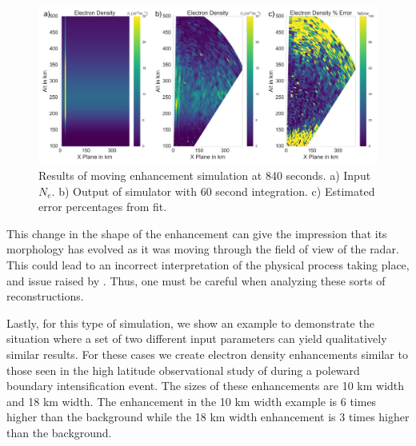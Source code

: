 \documentclass[draft,ras]{agutex}
\begin{document}
\begin{article}
\begin{figure}[!t]
\centering
\includegraphics[width=6in]{moving14mins}
\caption{Results of moving enhancement simulation at 840 seconds. a) Input $N_e$. b) Output of simulator with 60 second integration. c) Estimated error percentages from fit.}
\label{fig:moving14mins}
\end{figure}

This change in the shape of the enhancement can give the impression that its morphology has evolved as it was moving through the field of view of the radar. This could lead to an incorrect interpretation of the physical process taking place, and issue raised by \citet{Dahlgren:2012dq}.   Thus, one must be careful when analyzing these sorts of reconstructions.

Lastly, for this type of simulation, we show an example to demonstrate the situation where a set of two different input parameters can yield qualitatively similar results. For these cases we create electron density enhancements similar to those seen in the high latitude observational study of \citet{Semeter:2005fo} during a poleward boundary intensification event. The sizes of these enhancements are 10 km width and 18 km width. The enhancement in the 10 km width example is 6 times higher than the background while the 18 km width enhancement is 3 times higher than the background.


\end{article}
\end{document}

